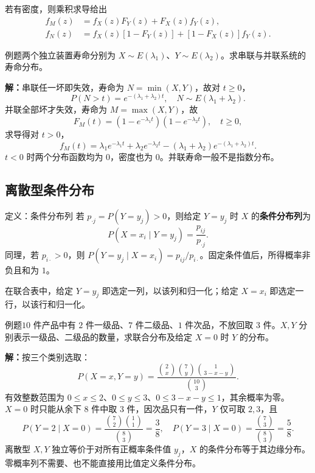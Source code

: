 \documentclass[UTF8,fontset=none,zihao=-4,a4paper]{ctexart}
\newcommand{\term}[1]{\textbf{#1}}
\newcommand{\example}[1]{\begin{infobox}{例题}#1\end{infobox}}
\newcommand{\solution}{\par\noindent\textbf{解：}}
\newcommand{\com}[2]{\binom{#1}{#2}}
\begin{document}
若有密度，则乘积求导给出
\begin{align*}
f_M(z)&=f_X(z)F_Y(z)+F_X(z)f_Y(z),\\
f_N(z)&=f_X(z)[1-F_Y(z)]+[1-F_X(z)]f_Y(z).
\end{align*}
\example{两个独立装置寿命分别为 $X\sim E(\lambda_1)$、$Y\sim E(\lambda_2)$。求串联与并联系统的寿命分布。}
\solution 串联任一坏即失效，寿命为 $N=\min(X,Y)$，故对 $t\ge0$，
\[
P(N>t)=e^{-(\lambda_1+\lambda_2)t},\quad
N\sim E(\lambda_1+\lambda_2).
\]
并联全部坏才失效，寿命为 $M=\max(X,Y)$，故
\[
F_M(t)=(1-e^{-\lambda_1t})(1-e^{-\lambda_2t}),\quad t\ge0,
\]
求导得对 $t>0$，
\[
f_M(t)=\lambda_1e^{-\lambda_1t}+\lambda_2e^{-\lambda_2t}
-(\lambda_1+\lambda_2)e^{-(\lambda_1+\lambda_2)t}.
\]
$t<0$ 时两个分布函数均为 $0$，密度也为 $0$。并联寿命一般不是指数分布。
\subsection{离散型条件分布}
\begin{infobox}{定义：条件分布列}
若 $p_{\cdot j}=P(Y=y_j)>0$，则给定 $Y=y_j$ 时 $X$ 的\term{条件分布列}为
\[
P(X=x_i\mid Y=y_j)=\frac{p_{ij}}{p_{\cdot j}}.
\]
同理，若 $p_{i\cdot}>0$，则 $P(Y=y_j\mid X=x_i)=p_{ij}/p_{i\cdot}$。固定条件值后，所得概率非负且和为 $1$。
\end{infobox}
在联合表中，给定 $Y=y_j$ 即选定一列，以该列和归一化；给定 $X=x_i$ 即选定一行，以该行和归一化。
\example{$10$ 件产品中有 $2$ 件一级品、$7$ 件二级品、$1$ 件次品，不放回取 $3$ 件。$X,Y$ 分别表示一级品、二级品的数量，求联合分布及给定 $X=0$ 时 $Y$ 的分布。}
\solution 按三个类别选取：
\[
P(X=x,Y=y)=\frac{\com2x\com7y\com1{3-x-y}}{\com{10}3}.
\]
有效整数范围为 $0\le x\le2$、$0\le y\le3$、$0\le3-x-y\le1$，其余概率为零。$X=0$ 时只能从余下 $8$ 件中取 $3$ 件，因次品只有一件，$Y$ 仅可取 $2,3$，且
\[
P(Y=2\mid X=0)=\frac{\com72\com11}{\com83}=\frac38,
\quad P(Y=3\mid X=0)=\frac{\com73}{\com83}=\frac58.
\]
离散型 $X,Y$ 独立等价于对所有正概率条件值 $y_j$，$X$ 的条件分布等于其边缘分布。零概率列不需要、也不能直接用比值定义条件分布。
\end{document}
